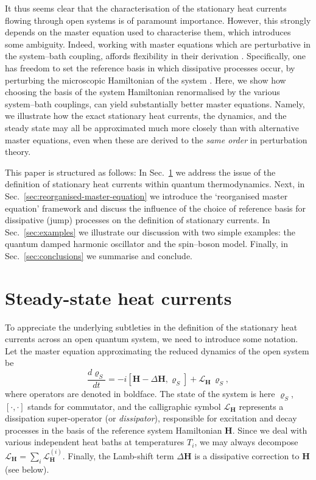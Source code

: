 \documentclass[aps,pra,superscriptaddress,twocolumn,nofootinbib]{revtex4-2}
\begin{document}
It thus seems clear that the characterisation of the stationary heat currents flowing through open systems is of paramount importance. However, this strongly depends on the master equation used to characterise them, which introduces some ambiguity. Indeed, working with master equations which are perturbative in the system--bath coupling, affords flexibility in their derivation \cite{winczewski2021,lobejko202,correa2023}. Specifically, one has freedom to set the reference basis in which dissipative processes occur, by perturbing the microscopic Hamiltonian of the system \cite{correa2023}. Here, we show how choosing the basis of the system Hamiltonian renormalised by the various system--bath couplings, can yield substantially better master equations. Namely, we illustrate how the exact stationary heat currents, the dynamics, and the steady state may all be approximated much more closely than with alternative master equations, even when these are derived to the \textit{same order} in perturbation theory. 

This paper is structured as follows: In Sec.~\ref{sec:heat-currents} we address the issue of the definition of stationary heat currents within quantum thermodynamics. Next, in Sec.~\ref{sec:reorganised-master-equation} we introduce the `reorganised master equation' framework and discuss the influence of the choice of reference basis for dissipative (jump) processes on the definition of stationary currents. In Sec.~\ref{sec:examples} we illustrate our discussion with two simple examples: the quantum damped harmonic oscillator and the spin--boson model. Finally, in Sec.~\ref{sec:conclusions} we summarise and conclude.

\section{Steady-state heat currents}\label{sec:heat-currents}

To appreciate the underlying subtleties in the definition of the stationary heat currents across an open quantum system, we need to introduce some notation. Let the master equation approximating the reduced dynamics of the open system be
\begin{equation}\label{eq:generic-master-equation}
    \frac{d\pmb{\varrho}_S}{dt} = -i[\pmb{H}-\Delta\pmb{H},\pmb{\varrho}_S] + \mathcal{L}_{\pmb{H}}\,\pmb{\varrho}_S,
\end{equation}
where operators are denoted in boldface. The state of the system is here $\pmb{\varrho}_S$, $[\cdot,\cdot]$ stands for commutator, and the calligraphic symbol $ \mathcal{L}_{\pmb{H}} $ represents a dissipation super-operator (or \textit{dissipator}), responsible for excitation and decay processes in the basis of the reference system Hamiltonian $ \pmb{H} $. Since we deal with various independent heat baths at temperatures $ T_i $, we may always decompose $ \mathcal{L}_{\pmb{H}} = \sum\nolimits_i \mathcal{L}_{\pmb{H}}^{(i)} $. Finally, the Lamb-shift term $\Delta\pmb{H}$ is a dissipative correction to $ \pmb{H} $ (see below).
\end{document}
